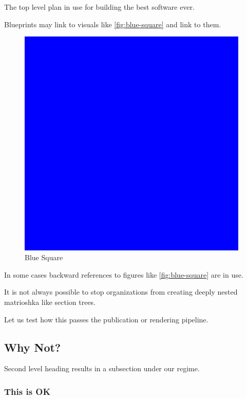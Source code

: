 The top level plan in use for building the best software ever.

Blueprints may link to visuals like \ref{fig:blue-square} and link to
them.

\begin{figure}
\centering
\includegraphics[width=0.98\textwidth,height=0.98\textheight]{images/blue.png}
\caption{Blue Square}
\end{figure}

In some cases backward references to figures like \ref{fig:blue-square}
are in use.

It is not always possible to stop organizations from creating deeply
nested matrioshka like section trees.

Let us test how this passes the publication or rendering pipeline.

\hypertarget{why-not}{%
\subsection{Why Not?}\label{why-not}}

Second level heading results in a subsection under our regime.

\hypertarget{this-is-ok}{%
\subsubsection{This is OK}\label{this-is-ok}}

